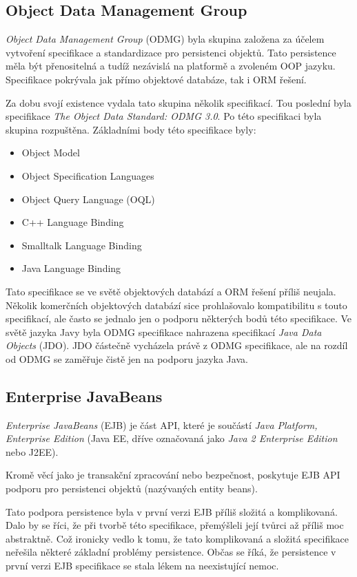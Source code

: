 \subsection{Object Data Management Group}
\emph{Object Data Management Group} (ODMG) byla skupina založena za účelem vytvoření specifikace a standardizace pro persistenci objektů. Tato persistence měla být přenositelná a tudíž nezávislá na platformě a zvoleném OOP jazyku. Specifikace pokrývala jak přímo objektové databáze, tak i ORM řešení.

Za dobu svojí existence vydala tato skupina několik specifikací. Tou poslední byla specifikace \emph{The Object Data Standard: ODMG 3.0}\cite{odmg}. Po této specifikaci byla skupina rozpuštěna. Základními body této specifikace byly:
\begin{itemize}
  \item Object Model
  \item Object Specification Languages
  \item Object Query Language (OQL)
  \item C++ Language Binding
  \item Smalltalk Language Binding
  \item Java Language Binding
\end{itemize}

Tato specifikace se ve světě objektových databází a ORM řešení příliš neujala. Několik komerčních objektových databází sice prohlašovalo kompatibilitu s touto specifikací, ale často se jednalo jen o podporu některých bodů této specifikace. Ve světě jazyka Javy byla ODMG specifikace nahrazena specifikací \emph{Java Data Objects} (JDO). JDO částečně vycházela právě z ODMG specifikace, ale na rozdíl od ODMG se zaměřuje čistě jen na podporu jazyka Java.

\subsection{Enterprise JavaBeans}
\emph{Enterprise JavaBeans} (EJB) je část API, které je součástí \emph{Java Platform, Enterprise Edition} (Java EE, dříve označovaná jako \emph{Java 2 Enterprise Edition} nebo J2EE).

Kromě věcí jako je transakční zpracování nebo bezpečnost, poskytuje EJB API podporu pro persistenci objektů (nazývaných entity beans).

Tato podpora persistence byla v první verzi EJB příliš složitá a komplikovaná. Dalo by se říci, že při tvorbě této specifikace, přemýšleli její tvůrci až příliš moc abstraktně. Což ironicky vedlo k tomu, že tato komplikovaná a složitá specifikace neřešila některé základní problémy persistence. Občas se říká, že persistence v první verzi EJB specifikace se stala lékem na neexistující nemoc.

